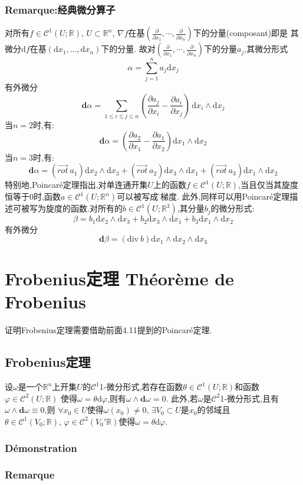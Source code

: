 \documentclass[12pt, a4paper, oneside]{ctexbook}
\newcommand{\di }{\text{d}}%
\newcommand{\pian }{\partial}%
\newcommand{\die }{\textbf{d}}%
\newcommand{\R }{\mathbb{R}}%
\newcommand{\fai }{\varphi}%
\newcommand{\C }{\mathcal{C}}%
\begin{document}
  \subsubsection{Remarque:经典微分算子}
  对所有$f\in\C^1(U;\R),\,U\subset\R^n$, $\nabla f$在基$(\frac{\pian}{\pian x_1},\cdots,\frac{\pian}{\pian x_n})$下的分量(composant)即是
  其微分$\di f$在基$(\di x_1,\dots,\di x_n)$下的分量.
  故对$(\frac{\pian}{\pian x_1},\cdots,\frac{\pian}{\pian x_n})$下的分量$a_j$,其微分形式
  $$
  \alpha=\sum_{j=1}^{n}a_j\di x_j
  $$
  有外微分
  $$
  \die \alpha=\sum_{1\leq i\leq j\leq n}(\frac{\pian a_j}{\pian x_i}-\frac{\pian a_i}{\pian x_j})\,\di x_i\wedge\di x_j
  $$
  当$n=2$时,有:
  $$
  \die \alpha=(\frac{\pian a_2}{\pian x_1}-\frac{\pian a_1}{\pian x_2} )\di x_1\wedge\di x_2
  $$
  当$n=3$时,有:
  $$
  \die \alpha=(\overrightarrow{rot}\ a_1 )\di x_2\wedge\di x_3+(\overrightarrow{rot}\ a_2 )\di x_3\wedge\di x_1+(\overrightarrow{rot}\ a_3 )\di x_1\wedge\di x_2
  $$
  特别地,Poincaré定理指出,对单连通开集$U$上的函数$f\in\C^1(U;\R)$,当且仅当其旋度恒等于0时,函数$a\in\C^1(U;\R^n)$可以被写成\f 的梯度.
  此外,同样可以用Poincaré定理描述可被写为旋度的函数.对所有的$b\in\C^1(U;\R^3)$,其分量$b_j$的微分形式:
  $$
  \beta =b_1\di x_2\wedge\di x_3  +  b_2\di x_3\wedge\di x_1+  b_3\di x_1\wedge\di x_2
  $$
  有外微分
  $$
  \die \beta=(\text{div}\ b)\di x_1\wedge\di x_2\wedge\di x_3
  $$

  \section{Frobenius定理 Théorème de Frobenius}
  证明Frobenius定理需要借助前面4.11提到的Poincaré定理.
  \subsection{Frobenius定理}
  设$\omega$是一个$\R^n$上开集$U$的$\C^1$1-微分形式,若存在函数$\theta\in\C^1(U;\R)$和函数$\fai\in\C^2(U;\R)$
  使得$\omega=\theta \di \fai$,则有$\omega\wedge\die \omega=0$.
  此外,若$\omega$是$\C^2$1-微分形式,且有$\omega\wedge\die\omega\equiv 0$,则
  $\forall x_0\in U$使得$\omega(x_0)\neq 0,\,\exists V_0\subset U$是$x_0$的邻域且$\theta \in\C^1(V_0;\R),\,\fai\in\C^2(V_0'\R)$使得$\omega=\theta \di \fai$.
  \subsubsection{Démonstration}

  \subsubsection{Remarque}
\end{document}
